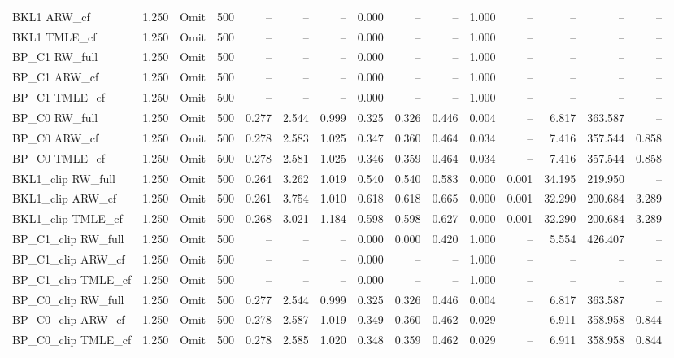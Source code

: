 \begin{tabular}{llllrrrrrrrrrrr}
BKL1 ARW\_cf & 1.250 & Omit & 500 & -- & -- & -- & 0.000 & -- & -- & 1.000 & -- & -- & -- & -- \\
BKL1 TMLE\_cf & 1.250 & Omit & 500 & -- & -- & -- & 0.000 & -- & -- & 1.000 & -- & -- & -- & -- \\
BP\_C1 RW\_full & 1.250 & Omit & 500 & -- & -- & -- & 0.000 & -- & -- & 1.000 & -- & -- & -- & -- \\
BP\_C1 ARW\_cf & 1.250 & Omit & 500 & -- & -- & -- & 0.000 & -- & -- & 1.000 & -- & -- & -- & -- \\
BP\_C1 TMLE\_cf & 1.250 & Omit & 500 & -- & -- & -- & 0.000 & -- & -- & 1.000 & -- & -- & -- & -- \\
BP\_C0 RW\_full & 1.250 & Omit & 500 & 0.277 & 2.544 & 0.999 & 0.325 & 0.326 & 0.446 & 0.004 & -- & 6.817 & 363.587 & -- \\
BP\_C0 ARW\_cf & 1.250 & Omit & 500 & 0.278 & 2.583 & 1.025 & 0.347 & 0.360 & 0.464 & 0.034 & -- & 7.416 & 357.544 & 0.858 \\
BP\_C0 TMLE\_cf & 1.250 & Omit & 500 & 0.278 & 2.581 & 1.025 & 0.346 & 0.359 & 0.464 & 0.034 & -- & 7.416 & 357.544 & 0.858 \\
BKL1\_clip RW\_full & 1.250 & Omit & 500 & 0.264 & 3.262 & 1.019 & 0.540 & 0.540 & 0.583 & 0.000 & 0.001 & 34.195 & 219.950 & -- \\
BKL1\_clip ARW\_cf & 1.250 & Omit & 500 & 0.261 & 3.754 & 1.010 & 0.618 & 0.618 & 0.665 & 0.000 & 0.001 & 32.290 & 200.684 & 3.289 \\
BKL1\_clip TMLE\_cf & 1.250 & Omit & 500 & 0.268 & 3.021 & 1.184 & 0.598 & 0.598 & 0.627 & 0.000 & 0.001 & 32.290 & 200.684 & 3.289 \\
BP\_C1\_clip RW\_full & 1.250 & Omit & 500 & -- & -- & -- & 0.000 & 0.000 & 0.420 & 1.000 & -- & 5.554 & 426.407 & -- \\
BP\_C1\_clip ARW\_cf & 1.250 & Omit & 500 & -- & -- & -- & 0.000 & -- & -- & 1.000 & -- & -- & -- & -- \\
BP\_C1\_clip TMLE\_cf & 1.250 & Omit & 500 & -- & -- & -- & 0.000 & -- & -- & 1.000 & -- & -- & -- & -- \\
BP\_C0\_clip RW\_full & 1.250 & Omit & 500 & 0.277 & 2.544 & 0.999 & 0.325 & 0.326 & 0.446 & 0.004 & -- & 6.817 & 363.587 & -- \\
BP\_C0\_clip ARW\_cf & 1.250 & Omit & 500 & 0.278 & 2.587 & 1.019 & 0.349 & 0.360 & 0.462 & 0.029 & -- & 6.911 & 358.958 & 0.844 \\
BP\_C0\_clip TMLE\_cf & 1.250 & Omit & 500 & 0.278 & 2.585 & 1.020 & 0.348 & 0.359 & 0.462 & 0.029 & -- & 6.911 & 358.958 & 0.844 \\

\end{tabular}
